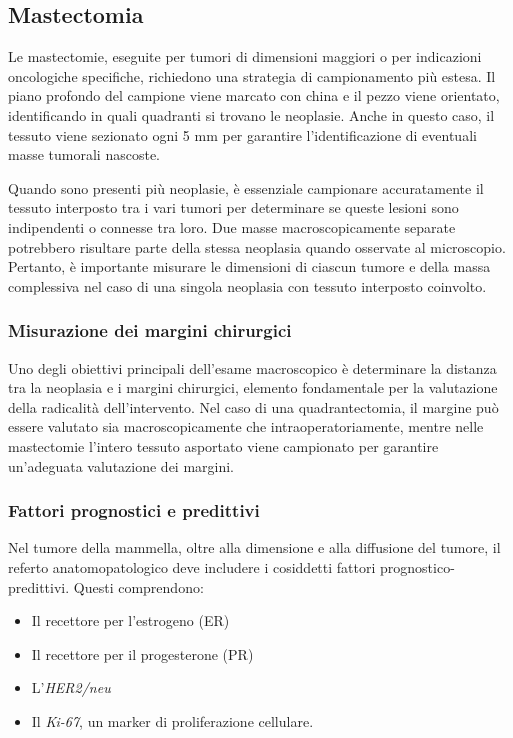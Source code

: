 \subsection{Mastectomia}
Le mastectomie, eseguite per tumori di dimensioni maggiori o per indicazioni oncologiche specifiche, richiedono una strategia di campionamento più estesa. Il piano profondo del campione viene marcato con china e il pezzo viene orientato, identificando in quali quadranti si trovano le neoplasie. Anche in questo caso, il tessuto viene sezionato ogni 5 mm per garantire l’identificazione di eventuali masse tumorali nascoste.

Quando sono presenti più neoplasie, è essenziale campionare accuratamente il tessuto interposto tra i vari tumori per determinare se queste lesioni sono indipendenti o connesse tra loro. Due masse macroscopicamente separate potrebbero risultare parte della stessa neoplasia quando osservate al microscopio. Pertanto, è importante misurare le dimensioni di ciascun tumore e della massa complessiva nel caso di una singola neoplasia con tessuto interposto coinvolto.

\subsubsection{Misurazione dei margini chirurgici}
Uno degli obiettivi principali dell’esame macroscopico è determinare la distanza tra la neoplasia e i margini chirurgici, elemento fondamentale per la valutazione della radicalità dell’intervento. Nel caso di una quadrantectomia, il margine può essere valutato sia macroscopicamente che intraoperatoriamente, mentre nelle mastectomie l’intero tessuto asportato viene campionato per garantire un’adeguata valutazione dei margini.

\subsubsection{Fattori prognostici e predittivi}
Nel tumore della mammella, oltre alla dimensione e alla diffusione del tumore, il referto anatomopatologico deve includere i cosiddetti fattori prognostico-predittivi. Questi comprendono:
\begin{itemize}
    \item Il recettore per l'estrogeno (ER)
    \item Il recettore per il progesterone (PR)
    \item L’\textit{HER2/neu}
    \item Il \textit{Ki-67}, un marker di proliferazione cellulare.
\end{itemize}

